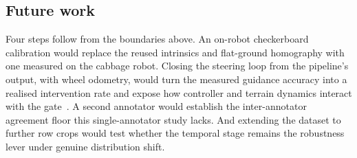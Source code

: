 \subsection{Future work}
\label{sec:future-work}
Four steps follow from the boundaries above. An on-robot checkerboard calibration would replace the reused
intrinsics and flat-ground homography with one measured on the cabbage robot. Closing the steering loop from
the pipeline's output, with wheel odometry, would turn the measured guidance accuracy into a realised
intervention rate and expose how controller and terrain dynamics interact with the gate~\cite{rajamani2012}. A second annotator would establish the
inter-annotator agreement floor this single-annotator study lacks. And extending the dataset to further row
crops would test whether the temporal stage remains the robustness lever under genuine distribution shift.